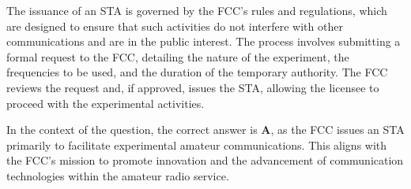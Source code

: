 The issuance of an STA is governed by the FCC's rules and regulations, which are designed to ensure that such activities do not interfere with other communications and are in the public interest. The process involves submitting a formal request to the FCC, detailing the nature of the experiment, the frequencies to be used, and the duration of the temporary authority. The FCC reviews the request and, if approved, issues the STA, allowing the licensee to proceed with the experimental activities.

In the context of the question, the correct answer is \textbf{A}, as the FCC issues an STA primarily to facilitate experimental amateur communications. This aligns with the FCC's mission to promote innovation and the advancement of communication technologies within the amateur radio service.

